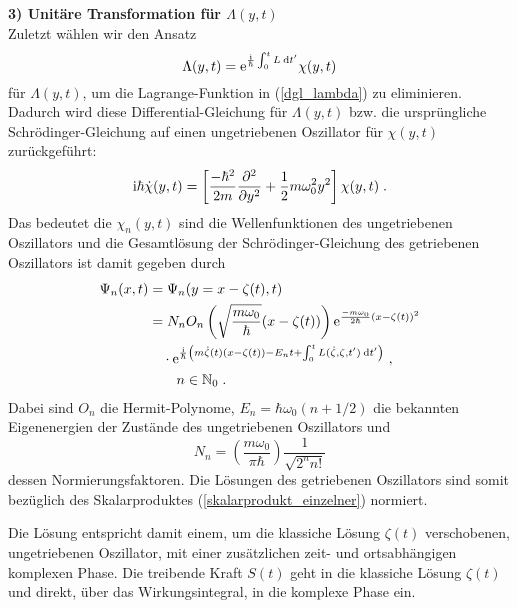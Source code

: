     \textbf{3) Unitäre Transformation für $\Lambda(y,t)$}\\
    Zuletzt wählen wir den Ansatz
    \begin{equation}
      \Lambda(y,t) = \text e^{\frac{\text i}{\hbar}\int_0^tL \: \text d t'}\chi(y,t)
    \end{equation}
    für $\Lambda(y,t)$, um die Lagrange-Funktion in (\ref{dgl_lambda}) zu eliminieren.
    Dadurch wird diese Differential-Gleichung für $\Lambda(y,t)$ bzw. die ursprüngliche Schrödinger-Gleichung auf einen ungetriebenen Oszillator für $\chi(y,t)$ zurückgeführt:
    \begin{equation}
      \text i \hbar \dot \chi(y,t) = \left[ \frac{-\hbar^2}{2m}\frac{\partial^2}{\partial y^2} + \frac{1}{2}m\omega_0^2y^2 \right]\chi(y,t) \; .
    \end{equation}
    Das bedeutet die $\chi_n(y,t)$ sind die Wellenfunktionen des ungetriebenen Oszillators und die Gesamtlösung der Schrödinger-Gleichung des getriebenen Oszillators ist damit gegeben durch
    \begin{align}
      \begin{split}
      \Psi_n(x,t) &= \Psi_n(y=x-\zeta(t),t) \\
      &= N_nO_n\left(\sqrt{\frac{m\omega_0}{\hbar}}(x-\zeta(t))\right) \text e^{\frac{-m\omega_0}{2\hbar}(x-\zeta(t))^2} \\
      &\quad \cdot \text e^{\frac{\text i}{\hbar}\left(m\dot \zeta(t)(x-\zeta(t))-E_nt+\int_0^tL(\dot \zeta,\zeta,t')\:\text dt'\right)} \; , \\
      &\quad \quad n \in \mathbb{N}_0 \; .
    \end{split}
    \end{align}
    Dabei sind $O_n$ die Hermit-Polynome, $E_n = \hbar \omega_0(n+1/2)$ die bekannten Eigenenergien der Zustände des ungetriebenen Oszillators und
    \begin{equation}
      N_n = \left(\frac{m\omega_0}{\pi \hbar}\right) \frac{1}{\sqrt{2^nn!}}
    \end{equation}
    dessen Normierungsfaktoren.
    Die Lösungen des getriebenen Oszillators sind somit bezüglich des Skalarproduktes (\ref{skalarprodukt_einzelner}) normiert.

    Die Lösung entspricht damit einem, um die klassiche Lösung $\zeta(t)$ verschobenen, ungetriebenen Oszillator, mit einer zusätzlichen zeit- und ortsabhängigen komplexen Phase.
    Die treibende Kraft $S(t)$ geht in die klassiche Lösung $\zeta(t)$ und direkt, über das Wirkungsintegral, in die komplexe Phase ein.


